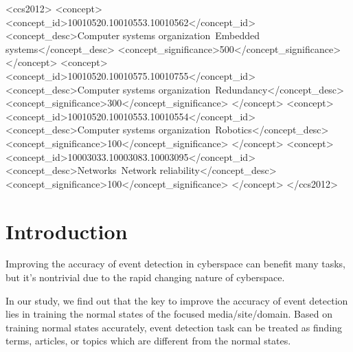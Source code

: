 \documentclass{sig-alternate-05-2015}
\begin{document}


%
%
\begin{CCSXML}
<ccs2012>
 <concept>
  <concept_id>10010520.10010553.10010562</concept_id>
  <concept_desc>Computer systems organization~Embedded systems</concept_desc>
  <concept_significance>500</concept_significance>
 </concept>
 <concept>
  <concept_id>10010520.10010575.10010755</concept_id>
  <concept_desc>Computer systems organization~Redundancy</concept_desc>
  <concept_significance>300</concept_significance>
 </concept>
 <concept>
  <concept_id>10010520.10010553.10010554</concept_id>
  <concept_desc>Computer systems organization~Robotics</concept_desc>
  <concept_significance>100</concept_significance>
 </concept>
 <concept>
  <concept_id>10003033.10003083.10003095</concept_id>
  <concept_desc>Networks~Network reliability</concept_desc>
  <concept_significance>100</concept_significance>
 </concept>
</ccs2012>  
\end{CCSXML}



%
%

%
%
\printccsdesc



\section{Introduction}
Improving the accuracy of event detection in cyberspace can benefit many tasks, but it's nontrivial due to the rapid changing nature of cyberspace.

In our study, we find out that the key to improve the accuracy of event detection lies in training the normal states of the focused media/site/domain. Based on training normal states accurately, event detection task can be treated as finding terms, articles, or topics which are different from the normal states. 
\end{document}
